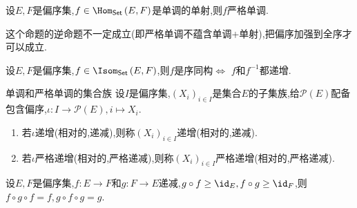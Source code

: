 \begin{proposition}{}{}
	设$E,F$是偏序集,$f\in\Hom_{\mathsf{Set}}\left(E,F\right)$是单调的单射,则$f$严格单调.
\end{proposition}

\begin{remark}{}{}
	这个命题的逆命题不一定成立(即严格单调不蕴含单调+单射),把偏序加强到全序才可以成立.
\end{remark}

\begin{proposition}{}{}
	设$E,F$是偏序集,$f\in\Isom_{\mathsf{Set}}\left(E,F\right)$,则$f$是序同构$\iff$ $f$和$f^{-1}$都递增.
\end{proposition}

\begin{definition}{单调和严格单调的集合族}{}
	设$I$是偏序集,$\left(X_{i}\right)_{i\in I}$是集合$E$的子集族,给$\mathcal{P}\left(E\right)$配备包含偏序,$\iota:I\to\mathcal{P}\left(E\right),i\mapsto X_{i}$.
	\begin{enumerate}
		\item 若$\iota$递增(相对的,递减),则称$\left(X_{i}\right)_{i\in I}$递增(相对的,递减).
		\item 若$\iota$严格递增(相对的,严格递减),则称$\left(X_{i}\right)_{i\in I}$严格递增(相对的,严格递减).
	\end{enumerate}
\end{definition}

\begin{proposition}{}{}
	设$E,F$是偏序集,$f:E\to F$和$g:F\to E$递减,$g\circ f\geq\id_{E},f\circ g\geq\id_{F}$,则$f\circ g\circ f=f,g\circ f\circ g=g$.
\end{proposition}

























































